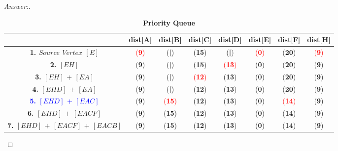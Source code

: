 \documentclass[11pt]{article}
\theoremstyle{definition}
\theoremstyle{definition}
\theoremstyle{definition}
\begin{document}
\begin{proof}[Answer:]
	\begin{table}[ht]
		\caption{\textbf{Priority Queue}}
		\centering
		\begin{tabular}{|c|c|c|c|c|c|c|c|}
			\hline
			& dist[\textbf{A}] & dist[\textbf{B}] & dist[\textbf{C}] & dist[\textbf{D}] & dist[\textbf{E}] & dist[\textbf{F}] & dist[\textbf{H}] \\  [0.5ex]
			\hline 
			\textbf{1. $Source$ $Vertex$ $[E]$} & \textcolor{red}{(\textbf{9})} & (\textbf{|}) & (\textbf{15}) & (\textbf{|}) & \textcolor{red}{(\textbf{0})} & (\textbf{20}) &  \textcolor{red}{(\textbf{9})} \\ 
			\hline 
			\textbf{2. $[EH]$} & (\textbf{9}) & (\textbf{|}) & (\textbf{15}) & \textcolor{red}{(\textbf{13})} & (\textbf{0}) & (\textbf{20}) & (\textbf{9}) \\ 
			\hline
			\textbf{3. $[EH]$ $+$ $[EA]$} & (\textbf{9}) & (\textbf{|}) & \textcolor{red}{(\textbf{12})} & (\textbf{13}) & (\textbf{0}) & (\textbf{20}) & (\textbf{9}) \\  
			\hline 
			\textbf{4. $[EHD]$ $+$ $[EA]$} & (\textbf{9}) & (\textbf{|}) & (\textbf{12}) & (\textbf{13}) & (\textbf{0}) & (\textbf{20}) & (\textbf{9}) \\  
			\hline 
			\textbf{\textcolor{blue}{5. $[EHD]$ $+$ $[EAC]$}} & (\textbf{9}) & \textcolor{red}{(\textbf{15})} & (\textbf{12}) & (\textbf{13}) & (\textbf{0}) & \textcolor{red}{(\textbf{14})} & (\textbf{9}) \\
			\hline
			\textbf{6. $[EHD]$ $+$ $[EACF]$} & (\textbf{9}) & (\textbf{15}) & (\textbf{12}) & (\textbf{13}) & (\textbf{0}) & (\textbf{14}) & (\textbf{9}) \\
			\hline 
			\textbf{7. $[EHD]$ $+$ $[EACF]$ $+$ $[EACB]$} & (\textbf{9}) & (\textbf{15}) & (\textbf{12}) & (\textbf{13}) & (\textbf{0}) & (\textbf{14}) & (\textbf{9}) \\  
			\hline 
		\end{tabular} 
        \label{table:nonlin}
	\end{table}	

\end{proof}





\newpage
\end{document}
